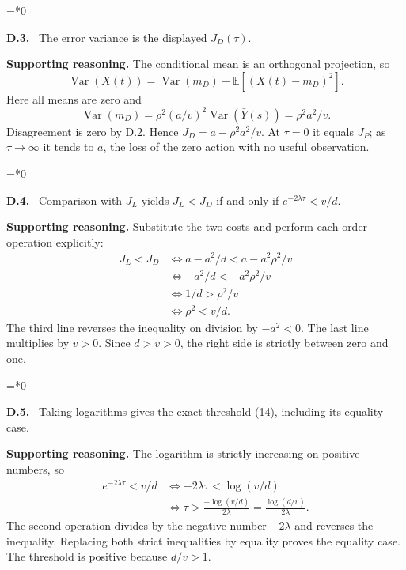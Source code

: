 \documentclass[12pt,letterpaper]{article}
\newcommand{\E}{\mathbb E}
\newcommand{\Var}{\operatorname{Var}}
\newenvironment{proofstep}[2]{%
  \begin{list}{}{\leftmargin=\dimexpr 0.17in*#2\relax%
  \setlength{\rightmargin}{0pt}\setlength{\topsep}{5pt}\setlength{\parsep}{2pt}}%
  \item[]\textbf{\textcolor{ink}{#1.}}\ }{\end{list}}
\begin{document}
\begin{proofstep}{D.3}{0}
\label{step:D.3}
The error variance is the displayed $J_D(\tau)$.

\textbf{Supporting reasoning.}
The conditional mean is an orthogonal projection, so
\[
\Var(X(t))=\Var(m_D)+\E[(X(t)-m_D)^2].
\]
Here all means are zero and
\[
\Var(m_D)=\rho^2(a/v)^2\Var(\bar Y(s))=\rho^2a^2/v.
\]
Disagreement is zero by D.2. Hence $J_D=a-\rho^2a^2/v$. At $\tau=0$ it equals $J_P$; as $\tau\to\infty$ it tends to $a$, the loss of the zero action with no useful observation.
\par{}
\end{proofstep}

\begin{proofstep}{D.4}{0}
\label{step:D.4}
Comparison with $J_L$ yields $J_L<J_D$ if and only if $e^{-2\lambda\tau}<v/d$.

\textbf{Supporting reasoning.}
Substitute the two costs and perform each order operation explicitly:
\begin{align*}
J_L<J_D
&\iff a-a^2/d<a-a^2\rho^2/v\\
&\iff -a^2/d<-a^2\rho^2/v\\
&\iff 1/d>\rho^2/v\\
&\iff \rho^2<v/d.
\end{align*}
The third line reverses the inequality on division by $-a^2<0$. The last line multiplies by $v>0$. Since $d>v>0$, the right side is strictly between zero and one.
\par{}
\end{proofstep}

\begin{proofstep}{D.5}{0}
\label{step:D.5}
Taking logarithms gives the exact threshold (14), including its equality case.

\textbf{Supporting reasoning.}
The logarithm is strictly increasing on positive numbers, so
\begin{align*}
e^{-2\lambda\tau}<v/d
&\iff -2\lambda\tau<\log(v/d)\\
&\iff \tau>\frac{-\log(v/d)}{2\lambda}
=\frac{\log(d/v)}{2\lambda}.
\end{align*}
The second operation divides by the negative number $-2\lambda$ and reverses the inequality. Replacing both strict inequalities by equality proves the equality case. The threshold is positive because $d/v>1$.
\par{}
\end{proofstep}
\end{document}
